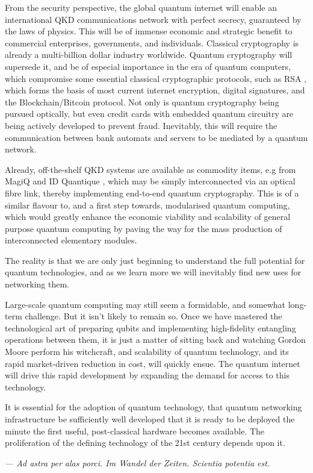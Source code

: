 \documentclass[aps,rmp,twocolumn,amsmath,amssymb,nofootinbib,superscriptaddress,longbibliography,floatfix]{revtex4-1}
\begin{document}
From the security perspective, the global quantum internet will enable an international QKD communications network with perfect secrecy, guaranteed by the laws of physics. This will be of immense economic and strategic benefit to commercial enterprises, governments, and individuals. Classical cryptography is already a multi-billion dollar industry worldwide. Quantum cryptography will supersede it, and be of especial importance in the era of quantum computers, which compromise some essential classical cryptographic protocols, such as RSA \cite{bib:RSA}, which forms the basis of most current internet encryption, digital signatures, and the Blockchain/Bitcoin protocol. Not only is quantum cryptography being pursued optically, but even credit cards with embedded quantum circuitry are being actively developed to prevent fraud. Inevitably, this will require the communication between bank automats and servers to be mediated by a quantum network.

Already, off-the-shelf QKD systems are available as commodity items, e.g from MagiQ \cite{bib:MagiQ} and ID Quantique \cite{bib:IDQuant}, which may be simply interconnected via an optical fibre link, thereby implementing end-to-end quantum cryptography. This is of a similar flavour to, and a first step towards, modularised quantum computing, which would greatly enhance the economic viability and scalability of general purpose quantum computing by paving the way for the mass production of interconnected elementary modules.

The reality is that we are only just beginning to understand the full potential for quantum technologies, and as we learn more we will inevitably find new uses for networking them.

Large-scale quantum computing may still seem a formidable, and somewhat long-term challenge. But it isn't likely to remain so. Once we have mastered the technological art of preparing qubits and implementing high-fidelity entangling operations between them, it is just a matter of sitting back and watching Gordon Moore perform his witchcraft, and scalability of quantum technology, and its rapid market-driven reduction in cost, will quickly ensue. The quantum internet will drive this rapid development by expanding the demand for access to this technology.

It is essential for the adoption of quantum technology, that quantum networking infrastructure be sufficiently well developed that it is ready to be deployed the minute the first useful, post-classical hardware becomes available. The proliferation of the defining technology of the 21st century depends upon it.

%
%

\begin{acknowledgments}
\emph{--- Ad astra per alas porci. Im Wandel der Zeiten. Scientia potentia est.}
\end{acknowledgments}

%
%


\end{document}
